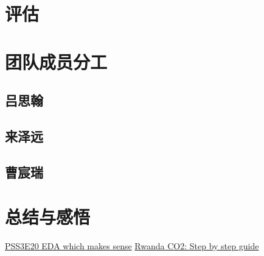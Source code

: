\documentclass{ctexart}
\begin{document}



\section{评估}

\section{团队成员分工}

\subsection{吕思翰}

\subsection{来泽远}

\subsection{曹宸瑞}

\section{总结与感悟}

\begin{thebibliography}{100}
\href{https://www.kaggle.com/code/ambrosm/pss3e20-eda-which-makes-sense}{PSS3E20 EDA which makes sense}
\href{https://www.kaggle.com/code/kacperrabczewski/rwanda-co2-step-by-step-guide}{Rwanda CO2: Step by step guide}
\end{thebibliography}
\end{document}
